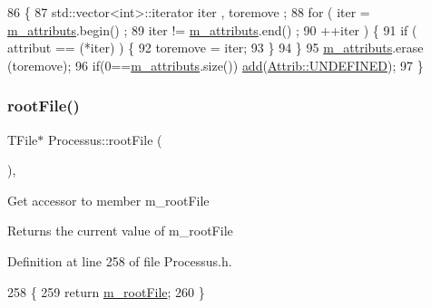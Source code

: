 \begin{DoxyCode}
86                                \{
87     std::vector<int>::iterator iter , toremove ;
88     \textcolor{keywordflow}{for} ( iter  = \hyperlink{classAttrib_ac4bd58a0cc6b38a3b711d609a3d3aacc}{m\_attributs}.begin() ;
89           iter != \hyperlink{classAttrib_ac4bd58a0cc6b38a3b711d609a3d3aacc}{m\_attributs}.end()   ;
90           ++iter ) \{
91       \textcolor{keywordflow}{if} ( attribut == (*iter) ) \{
92         toremove = iter;
93       \}
94     \}
95     \hyperlink{classAttrib_ac4bd58a0cc6b38a3b711d609a3d3aacc}{m\_attributs}.erase (toremove);
96     \textcolor{keywordflow}{if}(0==\hyperlink{classAttrib_ac4bd58a0cc6b38a3b711d609a3d3aacc}{m\_attributs}.size()) \hyperlink{classAttrib_a235f773af19c900264a190b00a3b4ad7}{add}(\hyperlink{classAttrib_a69e171d7cc6417835a5a306d3c764235a3a8da2ab97dda18aebab196fe4100531}{Attrib::UNDEFINED});
97   \}
\end{DoxyCode}
\mbox{\label{classProcessus_a247e8c362ec08422cf53d08dd23b093c}} 
\subsubsection{\texorpdfstring{root\+File()}{rootFile()}}
{\footnotesize\ttfamily T\+File$\ast$ Processus\+::root\+File (\begin{DoxyParamCaption}{ }\end{DoxyParamCaption})\hspace{0.3cm}{\ttfamily [inline]}, {\ttfamily [inherited]}}

Get accessor to member m\+\_\+root\+File \begin{DoxyReturn}{Returns}
the current value of m\+\_\+root\+File 
\end{DoxyReturn}


Definition at line 258 of file Processus.\+h.


\begin{DoxyCode}
258                      \{
259     \textcolor{keywordflow}{return} \hyperlink{classProcessus_a76114f8cf2111e910c323a7ae05a015d}{m\_rootFile};
260   \}
\end{DoxyCode}
\mbox{\label{classObject_a870c5af919958c2136623b2d7816d123}} 
